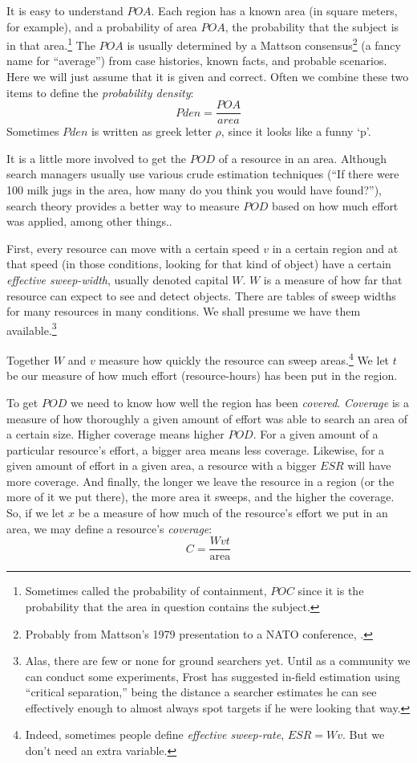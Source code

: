 It is easy to understand $POA$. Each region has a known area (in
square meters, for example), and a probability of area $POA$, the
probability that the subject is in that area.\footnote{Sometimes
  called the probability of containment, $POC$ since it is the
  probability that the area in question contains the subject.} The
$POA$ is usually determined by a Mattson consensus\footnote{Probably
  from Mattson's 1979 presentation to a NATO conference,
  \cite{mattson80:_estab}.}  (a fancy name for ``average'') from case
histories, known facts, and probable scenarios.  Here we will just
assume that it is given and correct. Often we combine these two items
to define the \emph{probability density}:
\begin{equation}
  \label{eq:2}
  Pden = \frac{POA}{area}
\end{equation}
Sometimes $Pden$ is written as greek letter $\rho$, since it looks
like a funny `p'.

It is a little more involved to get the $POD$ of a resource in an
area. Although search managers usually use various crude estimation
techniques (``If there were 100 milk jugs in the area, how many do you 
think you would have found?''), search theory provides a better way to 
measure $POD$ based on how much effort was applied, among other things..

First, every resource can move with a certain speed $v$ in a certain
region and at that speed (in those conditions, looking for that kind
of object) have a certain
\emph{effective sweep-width}, usually denoted capital $W$.  $W$ is a
measure of how far that resource can expect to see and detect objects.
There are tables of sweep widths for many resources in many
conditions. We shall presume we have them available.\footnote{Alas,
  there are few or none for ground searchers yet. Until as a community 
  we can conduct some experiments, Frost has suggested in-field
  estimation using ``critical separation,'' being the distance
  a  searcher estimates he can see effectively enough to almost always
  spot targets if he were looking that way.}

Together $W$ and $v$ measure how quickly the resource can sweep
areas.\footnote{Indeed, sometimes people define \emph{effective
    sweep-rate}, $ESR = W v$. But we don't need an extra variable.}
We let $t$ be our measure of how much effort (resource-hours) has been
put in the region.

To get $POD$ we need to know how well the region has been
\emph{covered}. \emph{Coverage} is a measure of how thoroughly a given
amount of effort was able to search an area of a certain size. Higher
coverage means higher $POD$. For a given amount of a particular
resource's effort, a bigger area means less coverage. Likewise, for a
given amount of effort in a given area, a resource with a bigger $ESR$
will have more coverage. And finally, the longer we leave the resource
in a region (or the more of it we put there), the more area it sweeps,
and the higher the coverage. So, if we let $x$ be a measure of how
much of the resource's effort we put in an area, we may define a
resource's \emph{coverage}:
\begin{equation}
  \label{eq:C}
  C = \frac{Wvt}{\mathrm{area}}
\end{equation}

